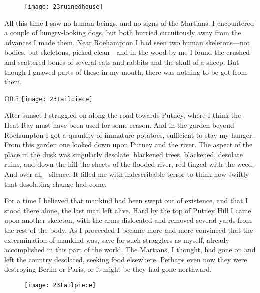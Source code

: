\begin{figure}[tb]
\centering
\texttt{[image: 23ruinedhouse]}
\end{figure}

All this time I saw no human beings, and no signs of the Martians. I encountered a couple of hungry-looking dogs, but both hurried circuitously away from the advances I made them. Near Roehampton I had seen two human skeletons—not bodies, but skeletons, picked clean—and in the wood by me I found the crushed and scattered bones of several cats and rabbits and the skull of a sheep. But though I gnawed parts of these in my mouth, there was nothing to be got from them.


\makeatletter
{}
{%
	\begin{wrapfigure}{O}{0.5\textwidth}
		\centering
		\texttt{[image: 23tailpiece]}
	\end{wrapfigure}
}{%

}
\makeatother

After sunset I struggled on along the road towards Putney, where I think the Heat-Ray must have been used for some reason. And in the garden beyond Roehampton I got a quantity of immature potatoes, sufficient to stay my hunger. From this garden one looked down upon Putney and the river. The aspect of the place in the dusk was singularly desolate: blackened trees, blackened, desolate ruins, and down the hill the sheets of the flooded river, red-tinged with the weed. And over all—silence. It filled me with indescribable terror to think how swiftly that desolating change had come.

For a time I believed that mankind had been swept out of existence, and that I stood there alone, the last man left alive. Hard by the top of Putney Hill I came upon another skeleton, with the arms dislocated and removed several yards from the rest of the body. As I proceeded I became more and more convinced that the extermination of mankind was, save for such stragglers as myself, already accomplished in this part of the world. The Martians, I thought, had gone on and left the country desolated, seeking food elsewhere. Perhaps even now they were destroying Berlin or Paris, or it might be they had gone northward.

\makeatletter
{}
{%
}{%
	\begin{figure}[bh!]
	\centering
	\texttt{[image: 23tailpiece]}
	\end{figure}
	\enlargethispage{2\baselineskip}
}
\makeatother

